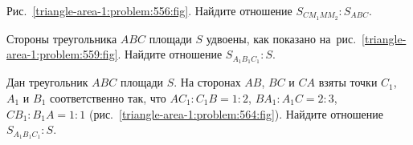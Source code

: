 \begin{problems}
\item
\label{triangle-area-1:problem:556}%
Рис.~\ref{triangle-area-1:problem:556:fig}.
Найдите отношение $S_{C M_1 M M_2} : S_{ABC}$.

\item
\label{triangle-area-1:problem:559}%
Стороны треугольника $ABC$ площади $S$ удвоены, как показано
на~рис.~\ref{triangle-area-1:problem:559:fig}.
Найдите отношение $S_{A_1 B_1 C_1} : S$.

\item
\label{triangle-area-1:problem:564}%
Дан треугольник $ABC$ площади $S$.
На сторонах $AB$, $BC$ и $CA$ взяты точки $C_1$, $A_1$ и $B_1$ соответственно
так, что
$A C_1 : C_1 B = 1 : 2$, $B A_1 : A_1 C = 2 : 3$, $C B_1 : B_1 A = 1 : 1$
(рис.~\ref{triangle-area-1:problem:564:fig}).
Найдите отношение $S_{A_1 B_1 C_1} : S$.

\end{problems}

